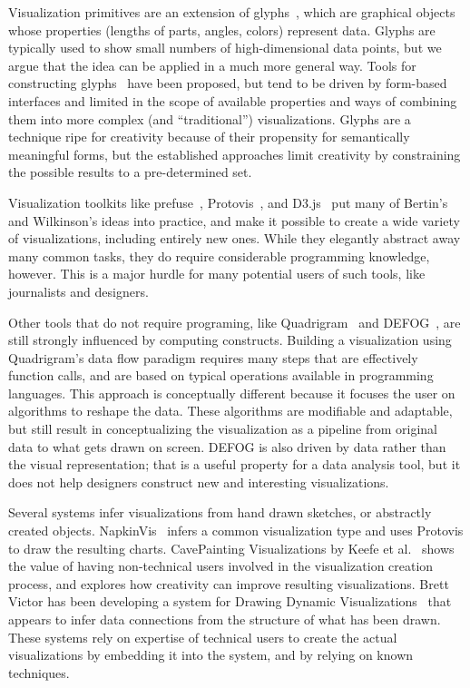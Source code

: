 Visualization primitives are an extension of glyphs~\cite{anderson1957semigraphical}, which are graphical objects whose properties (lengths of parts, angles, colors) represent data.
Glyphs are typically used to show small numbers of high-dimensional data points, but we argue that the idea can be applied in a much more general way.
Tools for constructing glyphs~\cite{ribarsky1994glyphmaker} have been proposed, but tend to be driven by form-based interfaces and limited in the scope of available properties and ways of combining them into more complex (and ``traditional'') visualizations.
Glyphs are a technique ripe for creativity because of their propensity for semantically meaningful forms, but the established approaches limit creativity by constraining the possible results to a pre-determined set.

\label{tools}

Visualization toolkits like prefuse~\cite{heer2005prefuse}, Protovis~\cite{bostock2009Protovis}, and D3.js~\cite{bostock2011d3} put many of Bertin's and Wilkinson's ideas into practice, and make it possible to create a wide variety of visualizations, including entirely new ones.
While they elegantly abstract away many common tasks, they do require considerable programming knowledge, however.
This is a major hurdle for many potential users of such tools, like journalists and designers.

Other tools that do not require programing, like Quadrigram~\cite{url:quadrigram,Ortiz2010} and DEFOG~\cite{Lins:TR:2011}, are still strongly influenced by computing constructs.
Building a visualization using Quadrigram's data flow paradigm requires many steps that are effectively function calls, and are based on typical operations available in programming languages.
This approach is conceptually different because it focuses the user on algorithms to reshape the data.
These algorithms are modifiable and adaptable, but still result in conceptualizing the visualization as a pipeline from original data to what gets drawn on screen.
DEFOG is also driven by data rather than the visual representation; that is a useful property for a data analysis tool, but it does not help designers construct new and interesting visualizations.

Several systems infer visualizations from hand drawn sketches, or abstractly created objects.
NapkinVis~\cite{Chao2010} infers a common visualization type and uses Protovis to draw the resulting charts.
CavePainting Visualizations by Keefe et al.~\cite{Keefe-2008-SSF} shows the value of having non-technical users involved in the visualization creation process, and explores how creativity can improve resulting visualizations.
Brett Victor has been developing a system for Drawing Dynamic Visualizations~\cite{url:drawingDynamic} that appears to infer data connections from the structure of what has been drawn.
These systems rely on expertise of technical users to create the actual visualizations by embedding it into the system, and by relying on known techniques.

